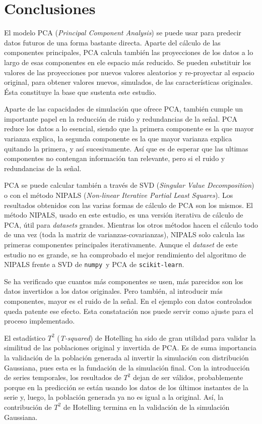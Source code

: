 \documentclass[11pt,spanish,listoffigures,listoftables]{tfgetsinf}
\begin{document}
 
\chapter{Conclusiones}

El modelo PCA ({\em Principal Component Analysis}) se puede usar para predecir datos futuros de una forma bastante directa. Aparte del cálculo de las componentes principales, PCA calcula también las proyecciones de los datos a lo largo de esas componentes en ele espacio más reducido. Se pueden substituir los valores de las proyecciones por nuevos valores aleatorios y re-proyectar al espacio original, para obtener valores nuevos, simulados, de las características originales. Ésta constituye la base que sustenta este estudio.

Aparte de las capacidades de simulación que ofrece PCA, también cumple un importante papel en la reducción de ruido y redundancias de la señal. PCA reduce los datos a lo esencial, siendo que la primera componente es la que mayor varianza explica, la segunda componente es la que mayor varianza explica quitando la primera, y así sucesivamente. Así que es de esperar que las ultimas componentes no contengan información tan relevante, pero si el ruido y redundancias de la señal. 

PCA se puede calcular también a través de SVD ({\em Singular Value Decomposition}) o con el método NIPALS ({\em Non-linear Iterative Partial Least Squares}). Los resultados obtenidos con las varias formas de cálculo de PCA son los mismos. El método NIPALS, usado en este estudio, es una versión iterativa de cálculo de PCA, útil para {\em datasets} grandes. Mientras los otros métodos hacen el cálculo todo de una vez (toda la matriz de varianzas-covarianzas), NIPALS solo calcula las primeras componentes principales iterativamente. Aunque el {\em dataset} de este estudio no es grande, se ha comprobado el mejor rendimiento del algoritmo de NIPALS frente a SVD de {\tt numpy} y PCA de {\tt scikit-learn}.

Se ha verificado que cuantos más componentes se usen, más parecidos son los datos invertidos a los datos originales. Pero también, al introducir más componentes, mayor es el ruido de la señal. En el ejemplo con datos controlados queda patente ese efecto. Esta constatación nos puede servir como ajuste para el proceso implementado.

El estadístico \(T^2\) ({\em T-squared}) de Hotelling ha sido de gran utilidad para validar la similitud de las poblaciones original y invertida de PCA. Es de suma importancia la validación de la población generada al invertir la simulación con distribución Gaussiana, pues esta es la fundación de la simulación final. Con la introducción de series temporales, los resultados de \(T^2\) dejan de ser válidos, probablemente porque en la predicción se están usando los datos de los últimos instantes de la serie y, luego, la población generada ya no es igual a la original. Así, la contribución de \(T^2\) de Hotelling termina en la validación de la simulación Gaussiana.
\end{document}
